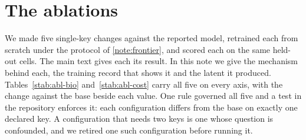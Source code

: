 %
%
%
%

\section{The ablations}
\label{note:ablations}

We made five single-key changes against the reported model, retrained each
from scratch under the protocol of \ref{note:frontier},
and scored each on the same held-out cells. The main text gives each its
result. In this note we give the mechanism behind each, the training record
that shows it and the latent it produced. Tables~\ref{stab:abl-bio}
and~\ref{stab:abl-cost} carry all five on every axis, with the change
against the base beside each value. One rule governed all five and a
test in the repository enforces it: each configuration differs from the
base on exactly one declared key. A configuration that needs two keys is
one whose question is confounded, and we retired one such configuration
before running it.

\begin{table}[p]
\centering
\caption[Ablations, biological axes]{\textbf{The five ablations on the
biological axes, with the change against the base in parentheses.} Held-out
split, same protocol as Table~\ref{stab:arms-bio}.}
\label{stab:abl-bio}
\footnotesize\setlength{\tabcolsep}{2.5pt}
\resizebox{\textwidth}{!}{}
\end{table}

